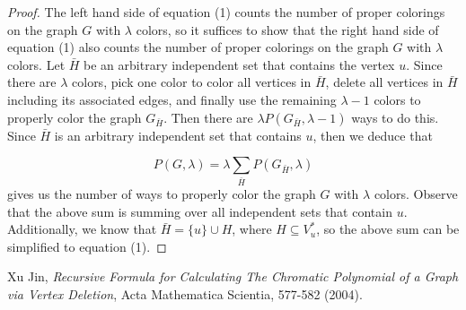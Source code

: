 \documentclass[11pt]{article}
\begin{document}
\begin{proof}
The left hand side of equation (1) counts the number of proper colorings on the graph $G$ with $\lambda$ colors, so it suffices to show that the right hand side of equation (1) also counts the number of proper colorings on the graph $G$ with $\lambda$ colors. Let $\bar{H}$ be an arbitrary independent set that contains the vertex $u$. Since there are $\lambda$ colors, pick one color to color all vertices in $\bar{H}$, delete all vertices in $\bar{H}$ including its associated edges, and finally use the remaining $\lambda - 1$ colors to properly color the graph $G_{\bar{H}}$. Then there are $\lambda P(G_{\bar{H}}, \lambda - 1)$ ways to do this. Since $\bar{H}$ is an arbitrary independent set that contains $u$, then we deduce that 

\begin{equation}
P(G,\lambda) = \lambda\sum_{\bar{H}} P(G_{\bar{H}},\lambda) \nonumber
\end{equation} gives us the number of ways to properly color the graph $G$ with $\lambda$ colors. Observe that the above sum is summing over all independent sets that contain $u$. Additionally, we know that $\bar{H} = \{u\} \cup H$, where $H \subseteq V_{u}^*$, so the above sum can be simplified to equation (1).

\end{proof}


\begin{thebibliography}{9}
Xu Jin, \emph{Recursive Formula for Calculating The Chromatic Polynomial of a Graph via Vertex Deletion}, Acta Mathematica Scientia, 577-582 (2004).
\end{thebibliography}
\end{document}

